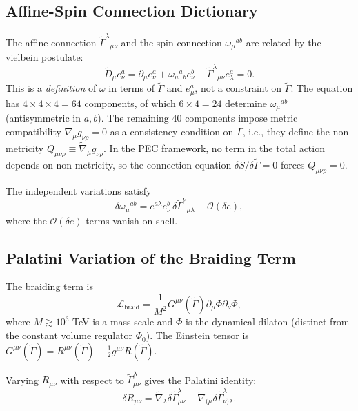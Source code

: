 \documentclass[twocolumn,prd,amsmath,amssymb]{revtex4-2}
\begin{document}
\subsection{Affine-Spin Connection Dictionary}

The affine connection $\tilde{\Gamma}^\lambda{}_{\mu\nu}$ and the spin connection
$\omega_\mu{}^{ab}$ are related by the vielbein postulate:
\begin{equation}
\tilde{D}_\mu e^a_\nu = \partial_\mu e^a_\nu + \omega_\mu{}^a{}_b e^b_\nu
- \tilde{\Gamma}^\lambda{}_{\mu\nu} e^a_\lambda = 0.
\label{eq:vielbein-post}
\end{equation}
This is a \emph{definition} of $\omega$ in terms of $\tilde{\Gamma}$ and $e^a_\mu$,
not a constraint on $\tilde{\Gamma}$.  The equation has $4\times4\times4 = 64$ components,
of which $6\times4 = 24$ determine $\omega_\mu{}^{ab}$ (antisymmetric in $a,b$).
The remaining $40$ components impose metric compatibility
$\tilde{\nabla}_\mu g_{\nu\rho}=0$ as a consistency condition on $\tilde{\Gamma}$,
i.e., they define the non-metricity $Q_{\mu\nu\rho} \equiv \tilde{\nabla}_\mu g_{\nu\rho}$.
In the PEC framework, no term in the total action depends on non-metricity, so the
connection equation $\delta S/\delta\tilde{\Gamma}=0$ forces $Q_{\mu\nu\rho}=0$.

The independent variations satisfy
\begin{equation}
\delta\omega_\mu{}^{ab} = e^{a\lambda} e^b_\nu \, \delta\tilde{\Gamma}^\nu{}_{\mu\lambda}
+ \mathcal{O}(\delta e),
\label{eq:var-dict}
\end{equation}
where the $\mathcal{O}(\delta e)$ terms vanish on-shell.

\subsection{Palatini Variation of the Braiding Term}
\label{sec:palatini-horndeski}

The braiding term is
\begin{equation}
\mathcal{L}_{\text{braid}} = \frac{1}{M^2}G^{\mu\nu}(\tilde{\Gamma})\partial_\mu\Phi\partial_\nu\Phi,
\label{eq:braid}
\end{equation}
where $M \gtrsim 10^3$ TeV is a mass scale and $\Phi$ is the dynamical dilaton (distinct
from the constant volume regulator $\Phi_0$).  The Einstein tensor is
$G^{\mu\nu}(\tilde{\Gamma}) = R^{\mu\nu}(\tilde{\Gamma}) - \frac12 g^{\mu\nu} R(\tilde{\Gamma})$.

Varying $R_{\mu\nu}$ with respect to $\tilde{\Gamma}^\lambda_{\mu\nu}$ gives the Palatini
identity:
\begin{equation}
\delta R_{\mu\nu} = \tilde{\nabla}_\lambda\delta\tilde{\Gamma}^\lambda_{\mu\nu}
- \tilde{\nabla}_{(\mu}\delta\tilde{\Gamma}^\lambda_{\nu)\lambda}.
\label{eq:palatini-id}
\end{equation}
\end{document}
